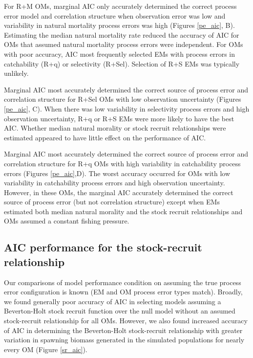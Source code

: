 \documentclass[
  12pt,
]{article}
\begin{document}
For R+M OMs, marginal AIC only accurately determined the correct process
error model and correlation structure when observation error was low and
variability in natural mortality process errors was high (Figures
\ref{pe_aic}, B). Estimating the median natural mortality rate reduced
the accuracy of AIC for OMs that assumed natural mortality process
errors were independent. For OMs with poor accuracy, AIC most frequently
selected EMs with process errors in catchability (R+q) or selectivity
(R+Sel). Selection of R+S EMs was typically unlikely.

Marginal AIC most accurately determined the correct source of process
error and correlation structure for R+Sel OMs with low observation
uncertainty (Figures \ref{pe_aic}, C). When there was low variability in
selectivity process errors and high observation uncertainty, R+q or R+S
EMs were more likely to have the best AIC. Whether median natural
morality or stock recruit relationships were estimated appeared to have
little effect on the performance of AIC.

Marginal AIC most accurately determined the correct source of process
error and correlation structure for R+q OMs with high variability in
catchability process errors (Figures \ref{pe_aic},D). The worst accuracy
occurred for OMs with low variability in catchability process errors and
high observation uncertainty. However, in these OMs, the marginal AIC
accurately determined the correct source of process error (but not
correlation structure) except when EMs estimated both median natural
morality and the stock recruit relationships and OMs assumed a constant
fishing pressure.

\hypertarget{aic-performance-for-the-stock-recruit-relationship}{%
\subsection*{AIC performance for the stock-recruit
relationship}\label{aic-performance-for-the-stock-recruit-relationship}}

Our comparisons of model performance condition on assuming the true
process error configuration is known (EM and OM process error types
match). Broadly, we found generally poor accuracy of AIC in selecting
models assuming a Beverton-Holt stock recruit function over the null
model without an assumed stock-recruit relationship for all OMs.
However, we also found increased accuracy of AIC in determining the
Beverton-Holt stock-recruit relationship with greater variation in
spawning biomass generated in the simulated populations for nearly every
OM (Figure \ref{sr_aic}).
\end{document}
